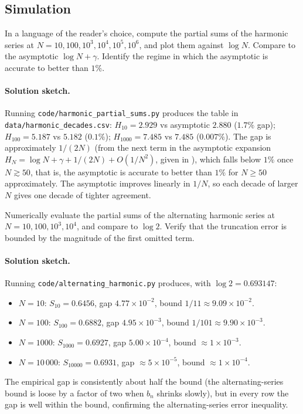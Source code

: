 \subsection*{Simulation}

\begin{exercise}
In a language of the reader's choice, compute the partial sums of the
harmonic series at $N = 10, 100, 10^{3}, 10^{4}, 10^{5}, 10^{6}$, and
plot them against $\log N$. Compare to the asymptotic $\log N + \gamma$.
Identify the regime in which the asymptotic is accurate to better than
$1\%$.

\paragraph{Solution sketch.} Running \texttt{code/harmonic\_partial\_sums.py}
produces the table in \texttt{data/harmonic\_decades.csv}: $H_{10} =
2.929$ vs asymptotic $2.880$ ($1.7\%$ gap); $H_{100} = 5.187$ vs
$5.182$ ($0.1\%$); $H_{1000} = 7.485$ vs $7.485$ ($0.007\%$). The
gap is approximately $1/(2N)$ (from the next term in the asymptotic
expansion $H_{N} = \log N + \gamma + 1/(2N) + O(1/N^{2})$, given in
\cite{text:v2ch04-knuth-taocp1-1997}), which falls below $1\%$ once
$N \gtrsim 50$, that is, the asymptotic is accurate to better than
$1\%$ for $N \geq 50$ approximately. The asymptotic improves linearly
in $1/N$, so each decade of larger $N$ gives one decade of tighter
agreement.
\end{exercise}

\begin{exercise}
Numerically evaluate the partial sums of the alternating harmonic
series at $N = 10, 100, 10^{3}, 10^{4}$, and compare to $\log 2$.
Verify that the truncation error is bounded by the magnitude of the
first omitted term.

\paragraph{Solution sketch.} Running \texttt{code/alternating\_harmonic.py}
produces, with $\log 2 = 0.693147$:
\begin{itemize}[leftmargin=*]
  \item $N = 10$: $S_{10} = 0.6456$, gap $4.77 \times 10^{-2}$,
    bound $1/11 \approx 9.09 \times 10^{-2}$.
  \item $N = 100$: $S_{100} = 0.6882$, gap $4.95 \times 10^{-3}$,
    bound $1/101 \approx 9.90 \times 10^{-3}$.
  \item $N = 1000$: $S_{1000} = 0.6927$, gap $5.00 \times 10^{-4}$,
    bound $\approx 1 \times 10^{-3}$.
  \item $N = 10\,000$: $S_{10000} = 0.6931$, gap $\approx 5 \times
    10^{-5}$, bound $\approx 1 \times 10^{-4}$.
\end{itemize}
The empirical gap is consistently about half the bound (the
alternating-series bound is loose by a factor of two when $b_{n}$
shrinks slowly), but in every row the gap is well within the bound,
confirming the alternating-series error inequality.
\end{exercise}


